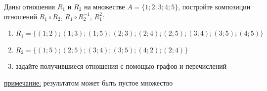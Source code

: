 \question
Даны отношения $R_1$ и $R_2$ на множестве $A = \{1; 2; 3; 4; 5\}$, постройте композиции отношений $R_1\circ R_2$, $R_1\circ R_2^{-1}$, $R_1^2$:
\begin{enumerate}
	\renewcommand{\labelenumi}{\alph{enumi})}
	\item $R_1 = \{(1; 2); (1; 3); (1; 5); (2; 3); (2; 4); (2; 5); (3; 4); (3; 5); (4; 5)\}$
	\item $R_2 = \{(1; 5); (2; 5); (3; 4); (3; 5); (4; 2); (2; 4)\}$
	\item задайте получившиеся отношения с помощью графов и перечислений 
\end{enumerate}

\underline{примечание:} результатом может быть пустое множество
